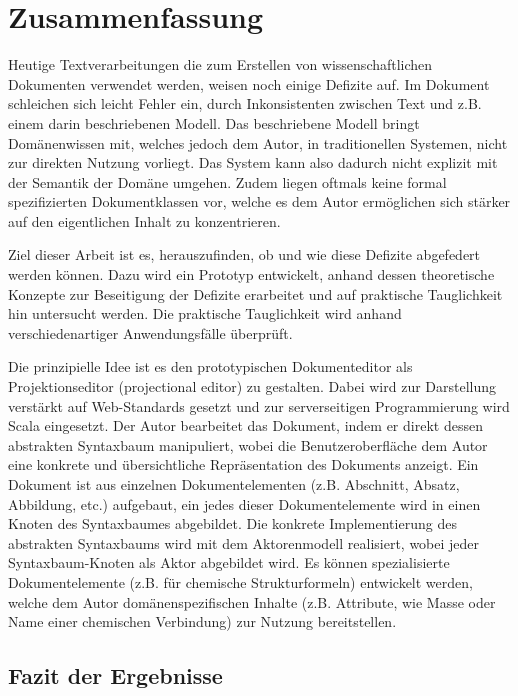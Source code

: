  
\chapter{Zusammenfassung}\label{}
 
Heutige Textverarbeitungen die zum Erstellen von wissenschaftlichen Dokumenten verwendet werden, weisen noch einige Defizite auf. Im Dokument schleichen sich leicht Fehler ein, durch Inkonsistenten zwischen Text und z.B. einem darin beschriebenen Modell. Das beschriebene Modell bringt Domänenwissen mit, welches jedoch dem Autor, in traditionellen Systemen, nicht zur direkten Nutzung vorliegt. Das System kann also dadurch nicht explizit mit der Semantik der Domäne umgehen. Zudem liegen oftmals keine formal spezifizierten Dokumentklassen vor, welche es dem Autor ermöglichen sich stärker auf den eigentlichen Inhalt zu konzentrieren.

 
Ziel dieser Arbeit ist es, herauszufinden, ob und wie diese Defizite abgefedert werden können. Dazu wird ein Prototyp entwickelt, anhand dessen theoretische Konzepte zur Beseitigung der Defizite erarbeitet und auf praktische Tauglichkeit hin untersucht werden. Die praktische Tauglichkeit wird anhand verschiedenartiger Anwendungsfälle überprüft.

 
Die prinzipielle Idee ist es den prototypischen Dokumenteditor als Projektionseditor (projectional editor) zu gestalten. Dabei wird zur Darstellung verstärkt auf Web-Standards gesetzt und zur serverseitigen Programmierung wird Scala eingesetzt. Der Autor bearbeitet das Dokument, indem er direkt dessen abstrakten Syntaxbaum manipuliert, wobei die Benutzeroberfläche dem Autor eine konkrete und übersichtliche Repräsentation des Dokuments anzeigt. Ein Dokument ist aus einzelnen Dokumentelementen (z.B. Abschnitt, Absatz, Abbildung, etc.) aufgebaut, ein jedes dieser Dokumentelemente wird in einen Knoten des Syntaxbaumes abgebildet. Die konkrete Implementierung des abstrakten Syntaxbaums wird mit dem Aktorenmodell realisiert, wobei jeder Syntaxbaum-Knoten als Aktor abgebildet wird. Es können spezialisierte Dokumentelemente (z.B. für chemische Strukturformeln) entwickelt werden, welche dem Autor domänenspezifischen Inhalte (z.B. Attribute, wie Masse oder Name einer chemischen Verbindung) zur Nutzung bereitstellen.

 
\section{Fazit der Ergebnisse}\label{}
 
